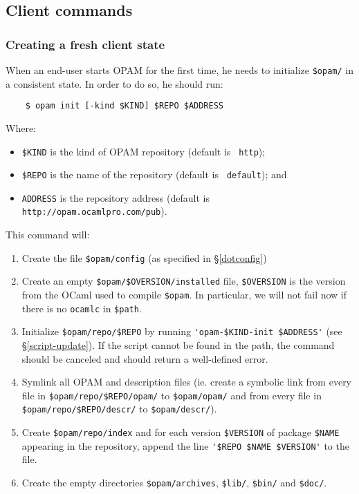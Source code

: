 \documentclass[a4paper,11pt]{article}
\begin{document}
\subsection{Client commands}

\subsubsection{Creating a fresh client state}
\label{opam-init}

When an end-user starts OPAM for the first time, he needs to
initialize \verb+$opam/+ in a consistent state. In order to do so, he
should run:

\begin{verbatim}
    $ opam init [-kind $KIND] $REPO $ADDRESS
\end{verbatim}

Where:
\begin{itemize}
\item \verb+$KIND+ is the kind of OPAM repository (default is {\tt
  http});
\item \verb+$REPO+ is the name of the repository (default is {\tt
  default}); and
\item \verb+ADDRESS+ is the repository address (default is
  \verb+http://opam.ocamlpro.com/pub+).
\end{itemize}

This command will:

\begin{enumerate}

\item Create the file \verb+$opam/config+ (as specified in
  \S\ref{dotconfig})

\item Create an empty \verb+$opam/$OVERSION/installed+ file,
  \verb+$OVERSION+ %
  is the version from the OCaml used to compile \verb+$opam+.
  In particular, we will not fail now 
  if there is no \verb+ocamlc+ in \verb+$path+.

\item Initialize \verb+$opam/repo/$REPO+ by running
  \verb+'opam-$KIND-init $ADDRESS'+ (see \S\ref{script-update}). If
  the script cannot be found in the path, the command should be
  canceled and should return a well-defined error.

\item Symlink all OPAM and description files (ie. create a symbolic
  link from every file in \verb+$opam/repo/$REPO/opam/+ to
  \verb+$opam/opam/+ and from every file in
  \verb+$opam/repo/$REPO/descr/+ to \verb+$opam/descr/+).

\item Create \verb+$opam/repo/index+ and for each version
  \verb+$VERSION+ of package \verb+$NAME+ appearing in the repository,
  append the line \verb+'$REPO $NAME $VERSION'+ to the file.

\item Create the empty directories \verb+$opam/archives+,
  \verb+$lib/+, \verb+$bin/+ and \verb+$doc/+.

\end{enumerate}
\end{document}

